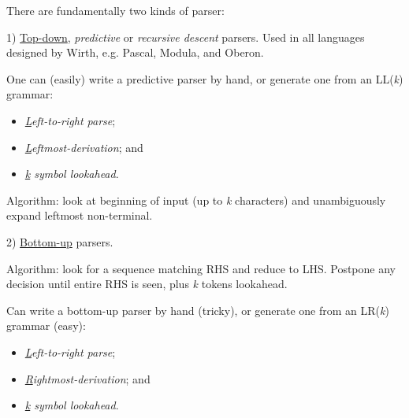 \begin{slide*}
There are fundamentally two kinds of parser:

\vspace{0.1in}

1) \underline{Top-down}, {\em predictive} or {\em recursive
    descent} parsers.  Used in all languages designed by
  Wirth, e.g. Pascal, Modula, and Oberon.

\begin{center}
\end{center}

One can (easily) write a predictive parser by hand, or generate one
from an LL({\em k}) grammar:
\begin{itemize}
\item {\em \underline{L}eft-to-right parse};
\item {\em \underline{L}eftmost-derivation}; and
\item {\em \underline{k} symbol lookahead}.
\end{itemize}

Algorithm: look at beginning of input (up to {\em k} characters) and
unambiguously expand leftmost non-terminal.

\vfil
\end{slide*}

\begin{slide*}
2) \underline{Bottom-up} parsers.

\vspace{0.1in}

Algorithm: look for a sequence matching RHS and reduce to LHS.
Postpone any decision until entire RHS is seen, plus {\em k} tokens
lookahead.

Can write a bottom-up parser by hand (tricky), or generate one
from an LR({\em k}) grammar (easy):
\begin{itemize}
\item {\em \underline{L}eft-to-right parse};
\item {\em \underline{R}ightmost-derivation}; and
\item {\em \underline{k} symbol lookahead}.
\end{itemize}

\vspace{0.1in}

\begin{center}
\end{center}

\vfil
\end{slide*}

